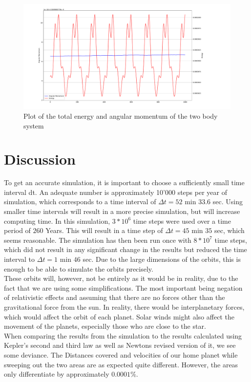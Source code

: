 \documentclass[reprint,english,notitlepage]{revtex4-2}
\begin{document}
	\begin{figure}[h!]
	  \centering
	  \includegraphics[scale = .15]{Figures/Energy_AngularMomentum_plot.pdf}
	  \caption{Plot of the total energy and angular momentum of the two body system}
	  \label{fig: tot_Energy_AM}
	\end{figure}
	

\section{Discussion}
To get an accurate simulation, it is important to choose a sufficiently small time interval dt.
An adequate number is approximately 10'000 steps per year of simulation, which corresponds to a time interval of $\Delta t = 52$ min $33.6$ sec.
Using smaller time intervals will result in a more precise simulation, but will increase computing time. In this simulation, $3*10^6$ time steps were used over a time period of $260$ Years.
This will result in a time step of $\Delta t = 45$ min $35$ sec, which seems reasonable.
The simulation has then been run once with $8*10^7$ time steps, which did not result in any significant change in the results but reduced the time interval to $\Delta t = 1$ min $46$ sec.
Due to the large dimensions of the orbits, this is enough to be able to simulate the orbits precisely.\\
These orbits will, however, not be entirely as it would be in reality, due to the fact that we are using some simplifications.
The most important being negation of relativistic effects and assuming that there are no forces other than the gravitational force from the sun.
In reality, there would be interplanetary forces, which would affect the orbit of each planet.
Solar winds might also affect the movement of the planets, especially those who are close to the star.\\
When comparing the results from the simulation to the results calculated using Kepler's second and third law as well as Newtons revised version of it, we see some deviance.
The Distances covered and velocities of our home planet while sweeping out the two areas are as expected quite different.
However, the areas only differentiate by approximately $0.0001\%$.\\
\end{document}
